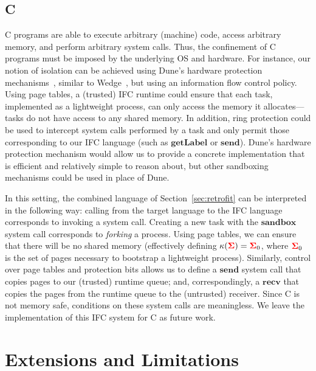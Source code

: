 \documentclass{llncs}
\begin{document}
\subsection{C}
\label{sec:real:c}
C programs are able to execute arbitrary (machine) code, access
arbitrary memory, and perform arbitrary system calls.
Thus, the confinement of C programs must be imposed by the underlying OS
and hardware.
For instance, our notion of isolation can be achieved using Dune's
hardware protection mechanisms~\cite{Belay:2012:DSU:2387880.2387913},
similar to 
Wedge~\cite{Belay:2012:DSU:2387880.2387913,
Bittau:2008:WSA:1387589.1387611}, but using an information flow control
policy.
Using page tables, a (trusted) IFC runtime could ensure that each task,
implemented as a lightweight process, can only access the memory it
allocates---tasks do not have access to any shared memory.
In addition, ring protection could be used to intercept system
calls performed by
a task and only permit those corresponding to our IFC language (such as
\ensuremath{\mathbf{getLabel}} or \ensuremath{\mathbf{send}}).
Dune's hardware protection mechanism would allow us to provide a concrete
implementation that is efficient and relatively simple to reason
about, but other sandboxing mechanisms could be used in place of Dune.

In this setting, the combined language of Section~\ref{sec:retrofit}
can be interpreted in the following way: calling from the target
language to the IFC language corresponds to invoking a system call.
Creating a new task with the \ensuremath{\mathbf{sandbox}} system call corresponds to
\emph{forking} a process.  Using page tables, we can ensure that
there will be no shared memory
(effectively
defining \ensuremath{\kappa(\tar{\Sigma})\mathrel{=}\tar{\Sigma}_{0}}, where \ensuremath{\tar{\Sigma}_{0}} is the set of pages necessary to bootstrap a
lightweight process).
Similarly, control over page tables and protection bits allows us to
define a \ensuremath{\mathbf{send}} system call that copies pages to our
(trusted) runtime queue; and, correspondingly, a \ensuremath{\mathbf{recv}} that copies
the pages from the runtime queue to the (untrusted) receiver.
Since C is not memory safe, conditions on these system calls are
meaningless.
We leave the implementation of this IFC system for C as future work.

\section{Extensions and Limitations}
\label{sec:extensions}
\label{sec:extensions:labeled}
\end{document}
